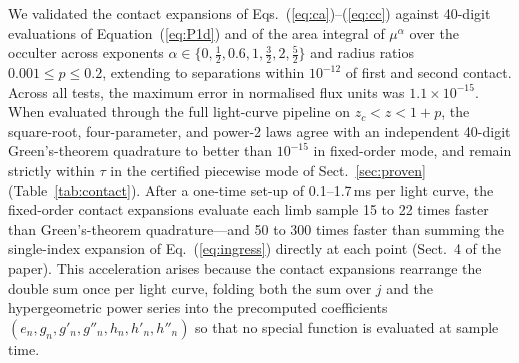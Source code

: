 \documentclass[11pt]{article}
\begin{document}
We validated the contact expansions of Eqs.~(\ref{eq:ca})--(\ref{eq:cc}) against 40-digit evaluations of Equation~(\ref{eq:P1d}) and of the area integral of $\mu^\alpha$ over the occulter across exponents $\alpha\in\{0,\tfrac12,0.6,1,\tfrac32,2,\tfrac52\}$ and radius ratios $0.001\le p\le0.2$, extending to separations within $10^{-12}$ of first and second contact. Across all tests, the maximum error in normalised flux units was $1.1\times10^{-15}$. When evaluated through the full light-curve pipeline on $z_c<z<1+p$, the square-root, four-parameter, and power-2 laws agree with an independent 40-digit Green's-theorem quadrature to better than $10^{-15}$ in fixed-order mode, and remain strictly within $\tau$ in the certified piecewise mode of Sect.~\ref{sec:proven} (Table~\ref{tab:contact}). After a one-time set-up of 0.1--1.7\,ms per light curve, the fixed-order contact expansions evaluate each limb sample 15 to 22 times faster than Green's-theorem quadrature---and 50 to 300 times faster than summing the single-index expansion of Eq.~(\ref{eq:ingress}) directly at each point (Sect.~4 of the paper). This acceleration arises because the contact expansions rearrange the double sum once per light curve, folding both the sum over $j$ and the hypergeometric power series into the precomputed coefficients $(e_n, g_n, g'_n, g''_n, h_n, h'_n, h''_n)$ so that no special function is evaluated at sample time.
\end{document}
